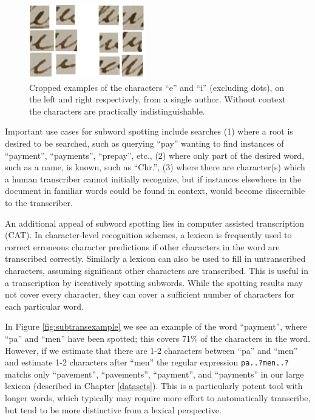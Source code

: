 \documentclass[ms,electronic,twosidetoc,letterpaper,chaptercenter,parttop,lof,lot]{byumsphd}
\begin{document}
\begin{figure}
    \centering
    \includegraphics[width=0.45\textwidth]{ei}
    \caption{Cropped examples of the characters ``e'' and ``i'' (excluding dots), on the left and right respectively, from a single author. Without context the characters are practically indistinguishable.}
    \label{fig:ei}
\end{figure}

Important use cases for subword spotting include searches (1) where a root is desired to be searched, such as querying ``pay'' wanting to find instances of ``payment'', ``payments'', ``prepay'', etc., (2) where only part of the desired word, such as a name, is known, such as ``Chr.'', (3) where there are character(s) which a human transcriber cannot initially recognize, but if instances elsewhere in the document in familiar words could be found in context, would become discernible to the transcriber.

An additional appeal of subword spotting lies in computer assisted transcription (CAT). In character-level recognition schemes, a lexicon is frequently used to correct erroneous character predictions if other characters in the word are transcribed correctly. Similarly a lexicon can also be used to fill in untranscribed characters, assuming significant other characters are transcribed. This is useful in a transcription by iteratively spotting subwords. While the spotting results may not cover every character, they can cover a sufficient number of characters for each particular word.

In Figure \ref{fig:subtransexample} we see an example of the word ``payment'', where ``pa'' and ``men'' have been spotted; this covers 71\% of the characters in the word. However, if we estimate that there are 1-2 characters between ``pa'' and ``men'' and estimate 1-2 characters after ``men'' the regular expression \texttt{pa..?men..?} matchs only ``pavement'', ``pavements'', ``payment'', and ``payments'' in our large lexicon (described in Chapter \ref{datasets}). This is a particularly potent tool with longer words, which typically may require more effort to automatically transcribe, but tend to be more distinctive from a lexical perspective.
\end{document}
